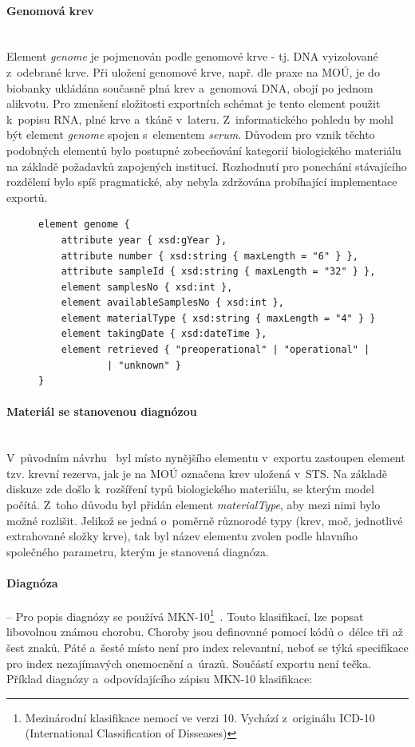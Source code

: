 \documentclass[11pt,draft,oneside]{fithesis2}
\newcommand{\paragraphNewLine}[1]{\paragraph*{#1}\mbox{}\\}
\begin{document}
\paragraphNewLine{Genomová krev}
Element \textit{genome} je pojmenován podle genomové krve - tj. DNA vyizolované z~odebrané krve. Při uložení genomové krve, např. dle praxe na MOÚ, je do biobanky ukládána současně plná krev a~genomová DNA, obojí po jednom alikvotu.
Pro zmenšení složitosti exportních schémat je tento element použit k~popisu RNA, plné krve a~tkáně v~lateru.
Z~informatického pohledu by mohl být element \textit{genome} spojen s~elementem \textit{serum}. Důvodem pro vznik těchto podobných elementů bylo postupné zobecňování kategorií biologického materiálu na základě požadavků zapojených institucí. Rozhodnutí pro ponechání stávajícího rozdělení bylo spíš pragmatické, aby nebyla zdržována probíhající implementace exportů. 

\begin{figure}[h!]
\begin{center}
\begin{lstlisting}[language=XML, caption={Element popisující genomovou krev v~exportním schématu.},
label={fig:export:data:genome}]
element genome {
	attribute year { xsd:gYear },
	attribute number { xsd:string { maxLength = "6" } },
	attribute sampleId { xsd:string { maxLength = "32" } },
	element samplesNo { xsd:int },
	element availableSamplesNo { xsd:int },
	element materialType { xsd:string { maxLength = "4" } }
	element takingDate { xsd:dateTime },
	element retrieved { "preoperational" | "operational" | "post" 
			| "unknown" }
}
\end{lstlisting}
\end{center}
\end{figure}


\paragraphNewLine{Materiál se stanovenou diagnózou}
V~původním návrhu~\cite{ARCH_2011_12_29} byl místo nynějšího elementu v~exportu zastoupen element tzv. krevní rezerva, jak je na MOÚ označena krev uložená v~STS. Na základě diskuze zde došlo k~rozšíření typů biologického materiálu, se kterým model počítá. Z~toho důvodu byl přidán element \textit{materialType}, aby mezi nimi bylo možné rozlišit. 
Jelikož se jedná o~poměrně různorodé typy (krev, moč, jednotlivé extrahované složky krve), tak byl název elementu zvolen podle hlavního společného parametru, kterým je stanovená diagnóza.

\paragraph*{Diagnóza} -- Pro popis diagnózy se používá MKN-10\footnote{Mezinárodní klasifikace nemocí ve verzi 10. Vychází z~originálu ICD-10 (International Classification of Disseases)}~\cite{MKN-10}. Touto klasifikací, lze popsat libovolnou známou chorobu.
Choroby jsou definované pomocí kódů o~délce tři až šest znaků. Páté a~šesté místo není pro index relevantní, neboť se týká specifikace pro index nezajímavých onemocnění a~úrazů. Součástí exportu není tečka. 
Příklad diagnózy a~odpovídajícího zápisu MKN-10 klasifikace:
\end{document}
